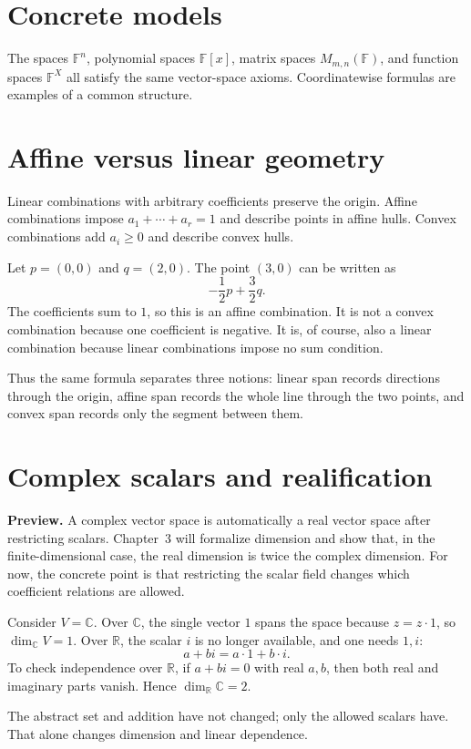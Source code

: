 \section{Concrete models}
The spaces $\mathbb F^n$, polynomial spaces $\mathbb F[x]$, matrix spaces $M_{m,n}(\mathbb F)$, and function spaces $\mathbb F^X$ all satisfy the same vector-space axioms. Coordinatewise formulas are examples of a common structure.

\section{Affine versus linear geometry}
Linear combinations with arbitrary coefficients preserve the origin. Affine combinations impose $a_1+\cdots+a_r=1$ and describe points in affine hulls. Convex combinations add $a_i\ge0$ and describe convex hulls.


\begin{example}\label{ex:i01-expand-02}
Let \(p=(0,0)\) and \(q=(2,0)\). The point \((3,0)\) can be written as
\[
-\frac12p+\frac32q.
\]
The coefficients sum to \(1\), so this is an affine combination. It is not a
convex combination because one coefficient is negative. It is, of course, also
a linear combination because linear combinations impose no sum condition.

Thus the same formula separates three notions: linear span records directions
through the origin, affine span records the whole line through the two points,
and convex span records only the segment between them.
\end{example}
\section{Complex scalars and realification}
\textbf{Preview.} A complex vector space is automatically a real vector space after restricting scalars. Chapter~3 will formalize dimension and show that, in the finite-dimensional case, the real dimension is twice the complex dimension. For now, the concrete point is that restricting the scalar field changes which coefficient relations are allowed.


\begin{example}\label{ex:i01-expand-03}
Consider \(V=\mathbb C\). Over \(\mathbb C\), the single vector \(1\) spans the
space because \(z=z\cdot1\), so \(\dim_{\mathbb C}V=1\). Over \(\mathbb R\),
the scalar \(i\) is no longer available, and one needs \(1,i\):
\[
a+bi=a\cdot1+b\cdot i.
\]
To check independence over \(\mathbb R\), if \(a+bi=0\) with real \(a,b\), then
both real and imaginary parts vanish. Hence \(\dim_{\mathbb R}\mathbb C=2\).

The abstract set and addition have not changed; only the allowed scalars have.
That alone changes dimension and linear dependence.
\end{example}
